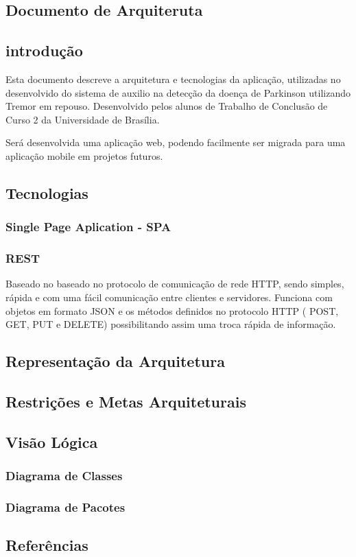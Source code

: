 \begin{anexosenv}

	\partanexos
	

	\chapter{Documento de Arquiteruta}
	\section{introdução}
	Esta documento descreve a arquitetura e tecnologias da aplicação, utilizadas no desenvolvido do sistema de auxilio na detecção da doença de Parkinson utilizando Tremor em repouso. Desenvolvido pelos alunos de Trabalho de Conclusão de Curso 2 da Universidade de Brasília.

	Será desenvolvida uma aplicação web, podendo facilmente ser migrada para uma aplicação mobile em projetos futuros.

	\section{Tecnologias}
	\subsection{Single Page Aplication - SPA}

	\subsection{REST}
	Baseado no baseado no protocolo de comunicação de rede HTTP, sendo simples, rápida e com uma fácil comunicação entre clientes e servidores. Funciona com objetos em formato JSON e os métodos definidos no protocolo HTTP ( POST, GET, PUT e DELETE) possibilitando assim uma troca rápida de informação.

	\section{Representação da Arquitetura}
	\section{Restrições e Metas Arquiteturais}
	\section{Visão Lógica}
	\subsection{Diagrama de Classes}
	\subsection{Diagrama de Pacotes}
	\section{Referências}

\end{anexosenv}

